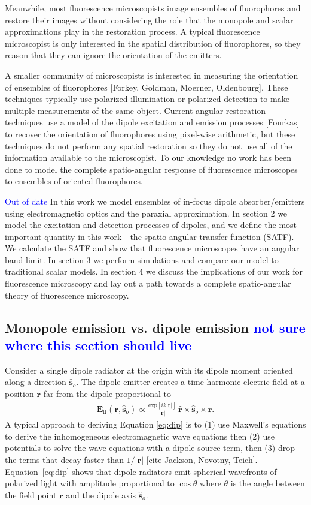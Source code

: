 \documentclass{osa-article}
\providecommand{\mb}[1]{\mathbf{#1}}
\providecommand{\so}{\mathbf{\hat{s}}_o}
\providecommand{\mh}[1]{\mathbf{\hat{#1}}}
\providecommand{\tb}[1]{\textcolor{blue}{#1}}
\begin{document}
Meanwhile, most fluorescence microscopists image ensembles of fluorophores and
restore their images without considering the role that the monopole and scalar
approximations play in the restoration process. A typical fluorescence
microscopist is only interested in the spatial distribution of fluorophores, so
they reason that they can ignore the orientation of the emitters.

A smaller community of microscopists is interested in measuring the orientation
of ensembles of fluorophores \cite{mehta2016} [Forkey, Goldman, Moerner,
Oldenbourg]. These techniques typically use polarized illumination or polarized
detection to make multiple measurements of the same object. Current angular
restoration techniques use a model of the dipole excitation and emission
processes [Fourkas] to recover the orientation of fluorophores using pixel-wise
arithmetic, but these techniques do not perform any spatial restoration so they
do not use all of the information available to the microscopist. To our
knowledge no work has been done to model the complete spatio-angular response of
fluorescence microscopes to ensembles of oriented fluorophores.

\tb{Out of date}
In this work we model ensembles of in-focus dipole absorber/emitters using
electromagnetic optics and the paraxial approximation. In section 2 we model the
excitation and detection processes of dipoles, and we define the most important
quantity in this work---the spatio-angular transfer function (SATF). We
calculate the SATF and show that fluorescence microscopes have an angular band
limit. In section 3 we perform simulations and compare our model to traditional
scalar models. In section 4 we discuss the implications of our work for
fluorescence microscopy and lay out a path towards a complete spatio-angular
theory of fluorescence microscopy.

\subsection{Monopole emission vs. dipole emission \tb{not sure where this section should live}}
Consider a single dipole radiator at the origin with its dipole moment oriented
along a direction $\so$. The dipole emitter creates a time-harmonic electric
field at a position $\mb{r}$ far from the dipole proportional to
\begin{align}
  \mb{E}_{\text{ff}}(\mb{r}, \so) \propto \frac{\text{exp}[ik|\mb{r}|]}{|\mb{r}|}\, \mh{r}\times\so\times\mh{r}.\label{eq:dip}
\end{align}
A typical approach to deriving Equation \ref{eq:dip} is to (1) use Maxwell's
equations to derive the inhomogeneous electromagnetic wave equations then (2)
use potentials to solve the wave equations with a dipole source term, then (3)
drop the terms that decay faster than $1/|\mb{r}|$ [cite Jackson, Novotny,
Teich]. Equation~\ref{eq:dip} shows that dipole radiators emit spherical
wavefronts of polarized light with amplitude proportional to $\cos\theta$ where
$\theta$ is the angle between the field point $\mb{r}$ and the dipole axis
$\so$.
\end{document}
